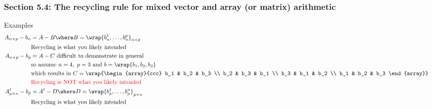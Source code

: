 \documentclass[11pt,pdftex,dvipsnames,usenames,helvetica]{beamer}
\newcommand*{\red}[1]{\textcolor{red}{#1}}
\begin{document}
\begin{frame}
\frametitle{Section 5.4: The recycling rule for mixed vector and array
  (or matrix) arithmetic} 
Examples
\begin{align*}
A_{n\times p} - b_n & = A-B \where B=\wrap{b_n^1, \dots, b_n^p}_{n \times p} \\
& \mbox{Recycling is what you likely intended} \\
A_{n\times p} - b_p & = A-C %
\mbox{\ difficult to demonstrate in general}\\
& \mbox{so assume $n=4,\ p=3$ and\ } b=\wrap{b_1, b_2, b_3}\\
& \mbox{which results in\ } C=\wrap{\begin{array}{ccc} 
b_1 & b_2 & b_3 \\
b_2 & b_3 & b_1 \\
b_3 & b_1 & b_2 \\
b_1 & b_2 & b_3
\end{array}} \\
& \mbox{\red{Recycling is NOT what you likely intended}} \\
A^t_{p \times n} - b_p & = A^t- D \where D=\wrap{b_p^1, \dots, b_p^n}_{p \times n} \\
& \mbox{Recycling is what you likely intended} \\
\end{align*}
\end{frame}
\end{document}

